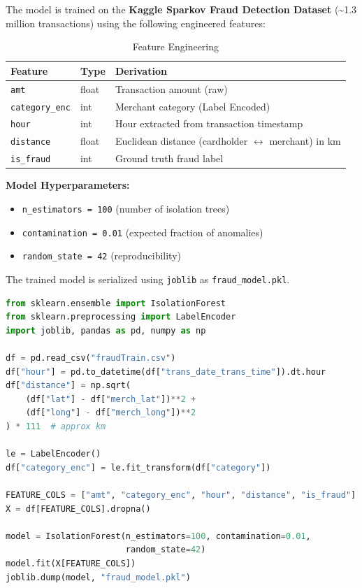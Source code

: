 \documentclass[12pt,a4paper]{article}
\begin{document}
The model is trained on the \textbf{Kaggle Sparkov Fraud Detection Dataset} (\textasciitilde1.3 million transactions) using the following engineered features:

\begin{table}[H]
\centering
\caption{Feature Engineering}
\begin{tabular}{@{}lll@{}}
\toprule
\textbf{Feature} & \textbf{Type} & \textbf{Derivation} \\
\midrule
\texttt{amt} & float & Transaction amount (raw) \\
\texttt{category\_enc} & int & Merchant category (Label Encoded) \\
\texttt{hour} & int & Hour extracted from transaction timestamp \\
\texttt{distance} & float & Euclidean distance (cardholder $\leftrightarrow$ merchant) in km \\
\texttt{is\_fraud} & int & Ground truth fraud label \\
\bottomrule
\end{tabular}
\end{table}

\textbf{Model Hyperparameters:}
\begin{itemize}
    \item \texttt{n\_estimators = 100} (number of isolation trees)
    \item \texttt{contamination = 0.01} (expected fraction of anomalies)
    \item \texttt{random\_state = 42} (reproducibility)
\end{itemize}

The trained model is serialized using \texttt{joblib} as \texttt{fraud\_model.pkl}.

\begin{lstlisting}[language=Python,caption={Model Training (train.py)}]
from sklearn.ensemble import IsolationForest
from sklearn.preprocessing import LabelEncoder
import joblib, pandas as pd, numpy as np

df = pd.read_csv("fraudTrain.csv")
df["hour"] = pd.to_datetime(df["trans_date_trans_time"]).dt.hour
df["distance"] = np.sqrt(
    (df["lat"] - df["merch_lat"])**2 +
    (df["long"] - df["merch_long"])**2
) * 111  # approx km

le = LabelEncoder()
df["category_enc"] = le.fit_transform(df["category"])

FEATURE_COLS = ["amt", "category_enc", "hour", "distance", "is_fraud"]
X = df[FEATURE_COLS].dropna()

model = IsolationForest(n_estimators=100, contamination=0.01,
                        random_state=42)
model.fit(X[FEATURE_COLS])
joblib.dump(model, "fraud_model.pkl")
\end{lstlisting}
\end{document}
